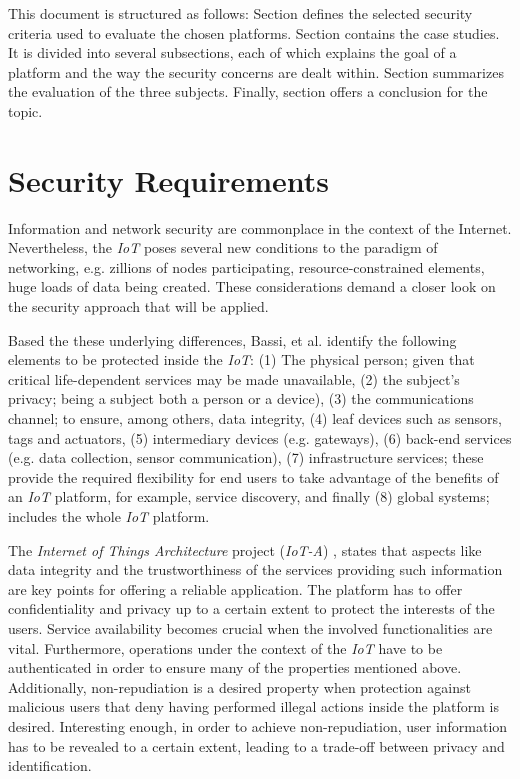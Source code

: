 \documentclass[journal]{IEEEtran}
\begin{document}
  This document is structured as follows: Section \uppercase\expandafter{} defines the selected security criteria used to evaluate the chosen platforms. Section \uppercase\expandafter{} contains the case studies. It is divided into several subsections, each of which explains the goal of a platform and the way the security concerns are dealt within. Section \uppercase\expandafter{} summarizes the evaluation of the three subjects. Finally, section \uppercase\expandafter{} offers a conclusion for the topic.

\section{Security Requirements}
  Information and network security are commonplace in the context of the Internet. Nevertheless, the \emph{IoT} poses several new conditions to the paradigm of networking, e.g. zillions of nodes participating, resource-constrained elements, huge loads of data being created. These considerations demand a closer look on the security approach that will be applied.

  Based the these underlying differences, Bassi, et al. \cite{Bassi2013} identify the following elements to be protected inside the \emph{IoT}: (1) The physical person; given that critical life-dependent services may be made unavailable, (2) the subject's privacy; being a subject both a person or a device), (3) the communications channel; to ensure, among others, data integrity, (4) leaf devices such as sensors, tags and actuators, (5) intermediary devices (e.g. gateways), (6) back-end services (e.g. data collection, sensor communication), (7) infrastructure services; these provide the required flexibility for end users to take advantage of the benefits of an \emph{IoT} platform, for example, service discovery, and finally (8) global systems; includes the whole \emph{IoT} platform.

  The \emph{Internet of Things Architecture} project (\emph{IoT-A}) \cite{Salinas2013}, states that aspects like data integrity and the trustworthiness of the services providing such information are key points for offering a reliable application. The platform has to offer confidentiality and privacy up to a certain extent to protect the interests of the users. Service availability becomes crucial when the involved functionalities are vital. Furthermore, operations under the context of the \emph{IoT} have to be authenticated in order to ensure many of the properties mentioned above. Additionally, non-repudiation is a desired property when protection against malicious users that deny having performed illegal actions inside the platform is desired. Interesting enough, in order to achieve non-repudiation, user information has to be revealed to a certain extent, leading to a trade-off between privacy and identification.
\end{document}
